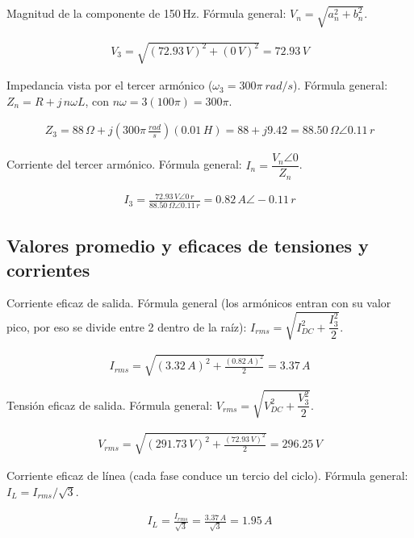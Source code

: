 \documentclass[11pt]{article}
\begin{document}
Magnitud de la componente de 150\,Hz. F\'ormula general: $V_n = \sqrt{a_n^2 + b_n^2}$.

\begin{align*}
V_3 = \sqrt{(72.93\,V)^2 + (0\,V)^2} = \boxed{72.93\,V}
\end{align*}

Impedancia vista por el tercer arm\'onico ($\omega_3 = 300\pi\ rad/s$). F\'ormula
general: $Z_n = R + j\,n\omega L$, con $n\omega = 3(100\pi) = 300\pi$.

\begin{align*}
Z_3 = 88\,\Omega + j\left(300\pi\,\tfrac{rad}{s}\right)(0.01\,H) = 88 + j9.42 = \boxed{88.50\,\Omega\angle 0.11\,r}
\end{align*}

Corriente del tercer arm\'onico. F\'ormula general: $I_n = \dfrac{V_n\angle 0}{Z_n}$.

\begin{align*}
I_3 = \frac{72.93\,V\angle 0\,r}{88.50\,\Omega\angle 0.11\,r} = \boxed{0.82\,A\angle -0.11\,r}
\end{align*}

\subsection{Valores promedio y eficaces de tensiones y corrientes}

Corriente eficaz de salida. F\'ormula general (los arm\'onicos entran con su valor
pico, por eso se divide entre 2 dentro de la ra\'iz):
$I_{rms} = \sqrt{I_{DC}^2 + \dfrac{I_3^2}{2}}$.

\begin{align*}
I_{rms} = \sqrt{(3.32\,A)^2 + \frac{(0.82\,A)^2}{2}} = \boxed{3.37\,A}
\end{align*}

Tensi\'on eficaz de salida. F\'ormula general:
$V_{rms} = \sqrt{V_{DC}^2 + \dfrac{V_3^2}{2}}$.

\begin{align*}
V_{rms} = \sqrt{(291.73\,V)^2 + \frac{(72.93\,V)^2}{2}} = \boxed{296.25\,V}
\end{align*}

Corriente eficaz de l\'inea (cada fase conduce un tercio del ciclo). F\'ormula
general: $I_L = I_{rms}/\sqrt{3}$.

\begin{align*}
I_L = \frac{I_{rms}}{\sqrt{3}} = \frac{3.37\,A}{\sqrt{3}} = \boxed{1.95\,A}
\end{align*}
\end{document}
